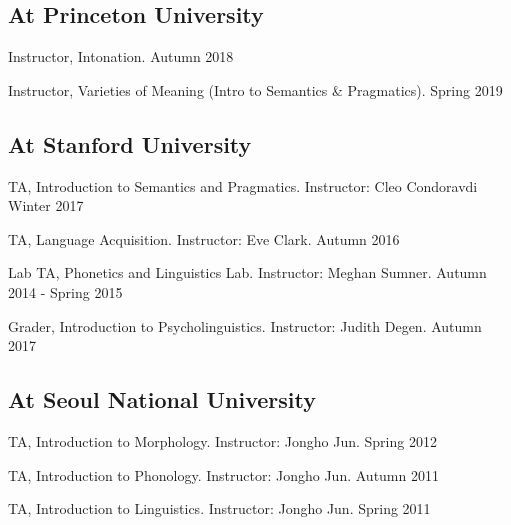 \documentclass[letterpaper]{article}
\renewenvironment{itemize}{
  \begin{list}{}{
    \setlength{\leftmargin}{1.5em}
  }
}{
  \end{list}
}
\begin{document}
\subsection*{At Princeton University}

\begin{itemize}\itemsep -1pt
\item Instructor, Intonation. \hfill Autumn 2018

\item Instructor, Varieties of Meaning (Intro to Semantics \& Pragmatics). \hfill Spring 2019
\end{itemize}

\subsection*{At Stanford University}

\begin{itemize}\itemsep -1pt
\item TA, Introduction to Semantics and Pragmatics. Instructor: Cleo Condoravdi \hfill Winter 2017

\item TA, Language Acquisition. Instructor: Eve Clark. \hfill Autumn 2016

\item Lab TA, Phonetics and Linguistics Lab. Instructor: Meghan Sumner. \hfill Autumn 2014 - Spring 2015


\item Grader, Introduction to Psycholinguistics. Instructor: Judith Degen. \hfill Autumn 2017
\end{itemize}


\subsection*{At Seoul National University}

\begin{itemize}\itemsep -1pt
\item TA, Introduction to Morphology. Instructor: Jongho Jun. \hfill Spring 2012

\item TA, Introduction to Phonology. Instructor: Jongho Jun. \hfill Autumn 2011

\item TA, Introduction to Linguistics. Instructor: Jongho Jun. \hfill Spring 2011
\end{itemize}
\end{document}
